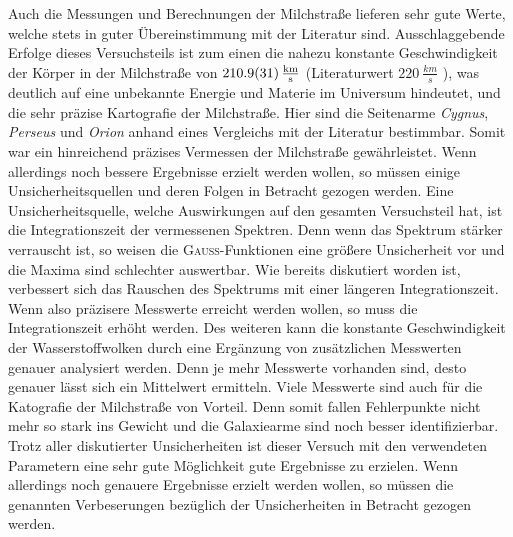 Auch die Messungen und Berechnungen der Milchstraße lieferen sehr gute Werte, welche stets in guter Übereinstimmung mit der Literatur sind. Ausschlaggebende Erfolge dieses Versuchsteils ist zum einen die nahezu konstante Geschwindigkeit der Körper in der Milchstraße von $\SI{210.9 \pm 3.1}{\frac{km}{s}}$ (Literaturwert $\SI{220}{\frac{km}{s}}$ \cite{LSR}), was deutlich auf eine unbekannte Energie und Materie im Universum hindeutet, und die sehr präzise Kartografie der Milchstraße. Hier sind die Seitenarme \textit{Cygnus}, \textit{Perseus} und \textit{Orion} anhand eines Vergleichs mit der Literatur bestimmbar.
Somit war ein hinreichend präzises Vermessen der Milchstraße gewährleistet. Wenn allerdings noch bessere Ergebnisse erzielt werden wollen, so müssen einige Unsicherheitsquellen und deren Folgen in Betracht gezogen werden. Eine Unsicherheitsquelle, welche Auswirkungen auf den gesamten Versuchsteil hat, ist die Integrationszeit der vermessenen Spektren. Denn wenn das Spektrum stärker verrauscht ist, so weisen die \textsc{Gauss}-Funktionen eine größere Unsicherheit vor und die Maxima sind schlechter auswertbar. Wie bereits diskutiert worden ist, verbessert sich das Rauschen des Spektrums mit einer längeren Integrationszeit. Wenn also präzisere Messwerte erreicht werden wollen, so muss die Integrationszeit erhöht werden. Des weiteren kann die konstante Geschwindigkeit der Wasserstoffwolken durch eine Ergänzung von zusätzlichen Messwerten genauer analysiert werden. Denn je mehr Messwerte vorhanden sind, desto genauer lässt sich ein Mittelwert ermitteln. Viele Messwerte sind auch für die Katografie der Milchstraße von Vorteil. Denn somit fallen Fehlerpunkte nicht mehr so stark ins Gewicht und die Galaxiearme sind noch besser identifizierbar. \\
Trotz aller diskutierter Unsicherheiten ist dieser Versuch mit den verwendeten Parametern eine sehr gute Möglichkeit gute Ergebnisse zu erzielen. Wenn allerdings noch genauere Ergebnisse erzielt werden wollen, so müssen die genannten Verbeserungen bezüglich der Unsicherheiten in Betracht gezogen werden.